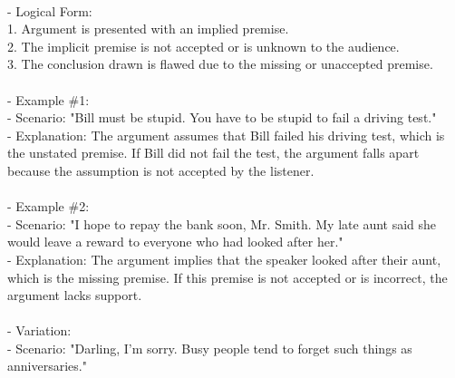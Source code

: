 \documentclass[a4paper,12pt,single,pdftex]{scrbook}
\begin{document}
    \\

    
      - Logical Form:
    \\

    
        1. Argument is presented with an implied premise. 
    \\

    
        2. The implicit premise is not accepted or is unknown to the audience. 
    \\

    
        3. The conclusion drawn is flawed due to the missing or unaccepted premise. 
    \\

    
      
    \\

    
      - Example \#1:
    \\

    
        - Scenario: "Bill must be stupid. You have to be stupid to fail a driving test." 
    \\

    
        - Explanation: The argument assumes that Bill failed his driving test, which is the unstated premise. If Bill did not fail the test, the argument falls apart because the assumption is not accepted by the listener. 
    \\

    
      
    \\

    
      - Example \#2:
    \\

    
        - Scenario: "I hope to repay the bank soon, Mr. Smith. My late aunt said she would leave a reward to everyone who had looked after her." 
    \\

    
        - Explanation: The argument implies that the speaker looked after their aunt, which is the missing premise. If this premise is not accepted or is incorrect, the argument lacks support. 
    \\

    
      
    \\

    
      - Variation:
    \\

    
        - Scenario: "Darling, I'm sorry. Busy people tend to forget such things as anniversaries." 
    \\
\end{document}
